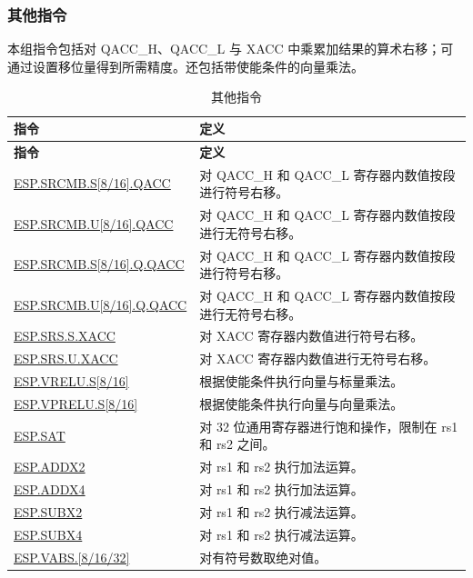 \documentclass[main\_\_CN.tex]{subfiles}
\begin{document}
\subsubsection{其他指令}

本组指令包括对 QACC\_H、QACC\_L 与 XACC 中乘累加结果的算术右移；可通过设置移位量得到所需精度。还包括带使能条件的向量乘法。

\begin{longtable}[c]{|l|m{10cm}|}
    \caption{其他指令}
    \label{tab:pie-others-instructions}\\
    \hline
    \rowcolor{lightgray}
    \textbf{指令} & \textbf{定义} \\\hline
    \endfirsthead
    \rowcolor{lightgray}
    \textbf{指令} & \textbf{定义} \\\hline
    \endhead
    \endfoot

    \hyperref[instruction:ESPSRCMBS8QACC]{ESP.SRCMB.S[8/16].QACC} & 对 QACC\_H 和 QACC\_L 寄存器内数值按段进行符号右移。
    \\\hline
    \hyperref[instruction:ESPSRCMBU8QACC]{ESP.SRCMB.U[8/16].QACC} & 对 QACC\_H 和 QACC\_L 寄存器内数值按段进行无符号右移。
    \\\hline
    \hyperref[instruction:ESPSRCMBS8QQACC]{ESP.SRCMB.S[8/16].Q.QACC} & 对 QACC\_H 和 QACC\_L 寄存器内数值按段进行符号右移。
    \\\hline
    \hyperref[instruction:ESPSRCMBU8QQACC]{ESP.SRCMB.U[8/16].Q.QACC} & 对 QACC\_H 和 QACC\_L 寄存器内数值按段进行无符号右移。
    \\\hline
    \hyperref[instruction:ESPSRSSXACC]{ESP.SRS.S.XACC} & 对 XACC 寄存器内数值进行符号右移。
    \\\hline
    \hyperref[instruction:ESPSRSUXACC]{ESP.SRS.U.XACC} & 对 XACC 寄存器内数值进行无符号右移。
    \\\hline
    \hyperref[instruction:ESPVRELUS8]{ESP.VRELU.S[8/16]} & 根据使能条件执行向量与标量乘法。
    \\\hline
    \hyperref[instruction:ESPVPRELUS8]{ESP.VPRELU.S[8/16]} & 根据使能条件执行向量与向量乘法。
    \\\hline
    \hyperref[instruction:ESPSAT]{ESP.SAT} & 对 32 位通用寄存器进行饱和操作，限制在 rs1 和 rs2 之间。
    \\\hline
    \hyperref[instruction:ESPADDX2]{ESP.ADDX2} & 对 rs1 和 rs2 执行加法运算。
    \\\hline
    \hyperref[instruction:ESPADDX4]{ESP.ADDX4} & 对 rs1 和 rs2 执行加法运算。
    \\\hline
    \hyperref[instruction:ESPSUBX2]{ESP.SUBX2} & 对 rs1 和 rs2 执行减法运算。
    \\\hline
    \hyperref[instruction:ESPSUBX4]{ESP.SUBX4} & 对 rs1 和 rs2 执行减法运算。
    \\\hline
    \hyperref[instruction:ESPVABS8]{ESP.VABS.[8/16/32]} & 对有符号数取绝对值。
    \\\hline

\end{longtable}
\end{document}
